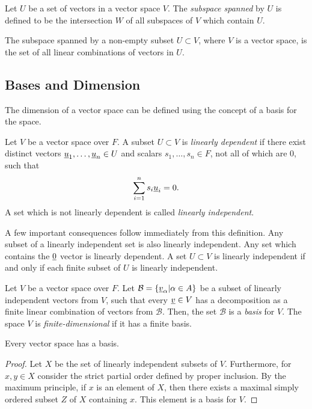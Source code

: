 \begin{definition}
Let $U$ be a set of vectors in a vector space $V$.
The \emph{subspace spanned} by $U$ is defined to be the intersection $W$ of all subspaces of $V$ which contain $U$.
\end{definition}

The subspace spanned by a non-empty subset $U \subset V$, where $V$ is a vector space, is the set of all linear combinations of vectors in $U$.


\subsection{Bases and Dimension}
\label{section:BasesAndDimension}

The dimension of a vector space can be defined using the concept of a basis for the space.

\begin{definition}
Let $V$ be a vector space over $F$.
A subset $U \subset V$ is \emph{linearly dependent} if there exist distinct vectors $\underline{u}_1, \ldots, \underline{u}_n \in U$ and scalars $s_1, \ldots, s_n \in F$, not all of which are $0$, such that
\begin{equation*}
\sum_{i=1}^n s_i \underline{u}_i = 0.
\end{equation*}
A set which is not linearly dependent is called \emph{linearly independent}.
\end{definition}

A few important consequences follow immediately from this definition.
Any subset of a linearly independent set is also linearly independent.
Any set which contains the $\underline{0}$ vector is linearly dependent.
A set $U \subset V$ is linearly independent if and only if each finite subset of $U$ is linearly independent.

\begin{definition}
Let $V$ be a vector space over $F$.
Let $\mathcal{B} = \left\{ \underline{v}_{\alpha} | \alpha \in A \right\}$ be a subset of linearly independent vectors from $V$, such that every $\underline{v} \in V$ has a decomposition as a finite linear combination of vectors from $\mathcal{B}$.
Then, the set $\mathcal{B}$ is a \emph{basis} for $V$.
The space $V$ is \emph{finite-dimensional} if it has a finite basis.
\end{definition}

\begin{theorem}
Every vector space has a basis.
\end{theorem}
\begin{proof}
Let $X$ be the set of linearly independent subsets of $V$.
Furthermore, for $x, y \in X$ consider the strict partial order defined by proper inclusion.
By the maximum principle, if $x$ is an element of $X$, then there exists a maximal simply ordered subset $Z$ of $X$ containing $x$.
This element is a basis for $V$.
\end{proof}

